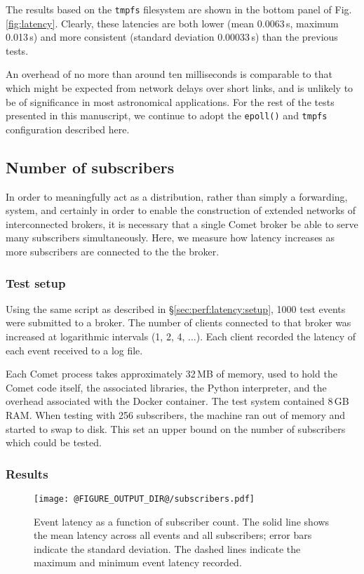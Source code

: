 \documentclass[5p,authoryear]{elsarticle}
\begin{document}
The results based on the \texttt{tmpfs} filesystem are shown in the bottom
panel of Fig. \ref{fig:latency}. Clearly, these latencies are both lower (mean
0.0063\,s, maximum 0.013\,s) and more consistent (standard deviation
0.00033\,s) than the previous tests.

An overhead of no more than around ten milliseconds is comparable to that
which might be expected from network delays over short links, and is unlikely
to be of significance in most astronomical applications. For the rest of the
tests presented in this manuscript, we continue to adopt the \texttt{epoll()}
and \texttt{tmpfs} configuration described here.

\subsection{Number of subscribers}

In order to meaningfully act as a distribution, rather than simply a
forwarding, system, and certainly in order to enable the construction of
extended networks of interconnected brokers, it is necessary that a single
Comet broker be able to serve many subscribers simultaneously. Here, we
measure how latency increases as more subscribers are connected to the the
broker.

\subsubsection{Test setup}

Using the same script as described in \S\ref{sec:perf:latency:setup}, 1000
test events were submitted to a broker. The number of clients connected to
that broker was increased at logarithmic intervals (1, 2, 4, ...). Each client
recorded the latency of each event received to a log file.

Each Comet process takes approximately 32\,MB of memory, used to hold the
Comet code itself, the associated libraries, the Python interpreter, and the
overhead associated with the Docker container. The test system contained 8\,GB
RAM. When testing with 256 subscribers, the machine ran out of memory and
started to swap to disk. This set an upper bound on the number of subscribers
which could be tested.

\subsubsection{Results}

\begin{figure}
  \begin{center}
  \texttt{[image: @FIGURE\_OUTPUT\_DIR@/subscribers.pdf]}
  \end{center}

  \caption{Event latency as a function of subscriber count. The solid line
  shows the mean latency across all events and all subscribers; error bars
  indicate the standard deviation. The dashed lines indicate the maximum and
  minimum event latency recorded.}

  \label{fig:subscribers}
\end{figure}
\end{document}
